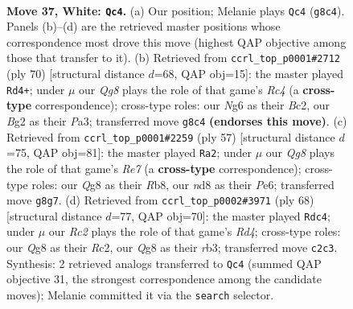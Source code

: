 \documentclass[11pt]{article}
\begin{document}
\clearpage

\begin{figure}[p]\centering
\begin{subfigure}{0.46\textwidth}\centering
\resizebox{\linewidth}{!}{%
\newchessgame
\chessboard[
  setfen={r2n2Q1/1p4p1/pk3pN1/6np/3R4/4P1P1/PPR2PBP/6K1 w - - 3 37},
  showmover=false,
  pgfstyle=straightmove, color=movearrow, markmove={g8-c4}
]}
\caption{}
\end{subfigure}\hfill
\begin{subfigure}{0.46\textwidth}\centering
\resizebox{\linewidth}{!}{%
\newchessgame
\chessboard[
  setfen={r7/1p3p2/2pk2pp/2n5/p1R5/P1P1P1P1/2B1KP1P/8 w - - 6 36},
  showmover=false,
  pgfstyle=straightmove, color=movearrow, markmove={c4-d4}
]}
\caption{}
\end{subfigure}
\\[4pt]
\begin{subfigure}{0.46\textwidth}\centering
\resizebox{\linewidth}{!}{%
\newchessgame
\chessboard[
  setfen={1r4k1/5pbp/2R1p1p1/pN1n4/P2P3P/BR4P1/4rPK1/8 b - - 1 29},
  showmover=false,
  pgfstyle=straightmove, color=movearrow, markmove={e2-a2}
]}
\caption{}
\end{subfigure}\hfill
\begin{subfigure}{0.46\textwidth}\centering
\resizebox{\linewidth}{!}{%
\newchessgame
\chessboard[
  setfen={6k1/2r1pp1p/3p2p1/2nPP3/3R4/1r2B1PP/2R2PK1/8 w - - 9 35},
  showmover=false,
  pgfstyle=straightmove, color=movearrow, markmove={d4-c4}
]}
\caption{}
\end{subfigure}
\caption{\textbf{Move 37, White: \texttt{Qc4}.} (a) Our position; Melanie plays \texttt{Qc4} (\texttt{g8c4}). Panels (b)--(d) are the retrieved master positions whose correspondence most drove this move (highest QAP objective among those that transfer to it). (b) Retrieved from \texttt{ccrl\_top\_p0001\#2712} (ply 70) [structural distance $d$=68, QAP obj=15]: the master played \texttt{Rd4+}; under $\mu$ our \emph{Qg8} plays the role of that game's \emph{Rc4} (a \textbf{cross-type} correspondence); cross-type roles: our \emph{N}g6 as their \emph{B}c2, our \emph{B}g2 as their \emph{P}a3; transferred move \texttt{g8c4} \textbf{(endorses this move)}. (c) Retrieved from \texttt{ccrl\_top\_p0001\#2259} (ply 57) [structural distance $d$=75, QAP obj=81]: the master played \texttt{Ra2}; under $\mu$ our \emph{Qg8} plays the role of that game's \emph{Re7} (a \textbf{cross-type} correspondence); cross-type roles: our \emph{Q}g8 as their \emph{R}b8, our \emph{n}d8 as their \emph{P}e6; transferred move \texttt{g8g7}. (d) Retrieved from \texttt{ccrl\_top\_p0002\#3971} (ply 68) [structural distance $d$=77, QAP obj=70]: the master played \texttt{Rdc4}; under $\mu$ our \emph{Rc2} plays the role of that game's \emph{Rd4}; cross-type roles: our \emph{Q}g8 as their \emph{R}c2, our \emph{Q}g8 as their \emph{r}b3; transferred move \texttt{c2c3}. Synthesis: 2 retrieved analogs transferred to \texttt{Qc4} (summed QAP objective 31, the strongest correspondence among the candidate moves); Melanie committed it via the \texttt{search} selector.}
\label{fig:thought-m72}
\end{figure}
\end{document}
